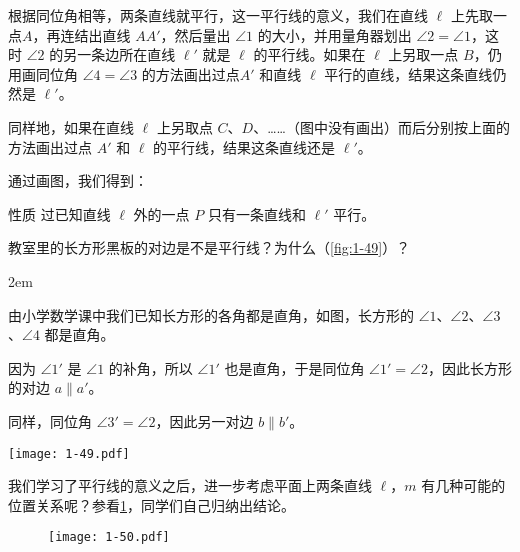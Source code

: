 \begin{solution}
根据同位角相等，两条直线就平行，这一平行线的意义，我们在直线 $\ell$ 上先取一点$A$，再连结出直线 $AA'$，然后量出 $\angle 1$ 的大小，并用量角器划出 $\angle 2=\angle 1$，这时 $\angle 2$ 的另一条边所在直线 $\ell'$ 就是 $\ell$ 的平行线。如果在 $\ell$ 上另取一点 $B$，仍用画同位角 $\angle 4=\angle 3$ 的方法画出过点$A'$ 和直线 $\ell$ 平行的直线，结果这条直线仍然是 $\ell'$。

同样地，如果在直线 $\ell$ 上另取点 $C$、$D$、……（图中没有画出）而后分别按上面的方法画出过点 $A'$ 和 $\ell$ 的平行线，结果这条直线还是 $\ell'$。

通过画图，我们得到：
\begin{Theorem}{性质}
	过已知直线 $\ell$ 外的一点 $P$ 只有一条直线和 $\ell'$ 平行。
\end{Theorem}
\end{solution}

\begin{example}
	教室里的长方形黑板的对边是不是平行线？为什么（\cref{fig:1-49}）？
\end{example}

\smallskip\noindent
\begin{minipage}{0.5\linewidth}\parindent2em
	\begin{solution}
		由小学数学课中我们已知长方形的各角都是直角，如图，长方形的 $\angle 1$、$\angle 2$、$\angle 3$、$\angle 4$ 都是直角。
		
		因为 $\angle 1'$ 是 $\angle 1$ 的补角，所以 $\angle 1'$ 也是直角，于是同位角 $\angle 1'=\angle 2$，因此长方形的对边 $a\parallel a'$。 
		
		同样，同位角 $\angle 3'=\angle 2$，因此另一对边 $b\parallel b'$。 
	\end{solution}
\end{minipage}
\begin{minipage}{0.45\linewidth}\centering
	\begin{figurehere}\quad
		\texttt{[image: 1-49.pdf]}
		\caption{}\label{fig:1-49}
	\end{figurehere}
\end{minipage}

\medskip 
我们学习了平行线的意义之后，进一步考虑平面上两条直线 $\ell$，$m$ 有几种可能的位置关系呢？参看\cref{fig:1-50}，同学们自己归纳出结论。
\begin{figure}
	\texttt{[image: 1-50.pdf]}
	\caption{}\label{fig:1-50}
\end{figure}


